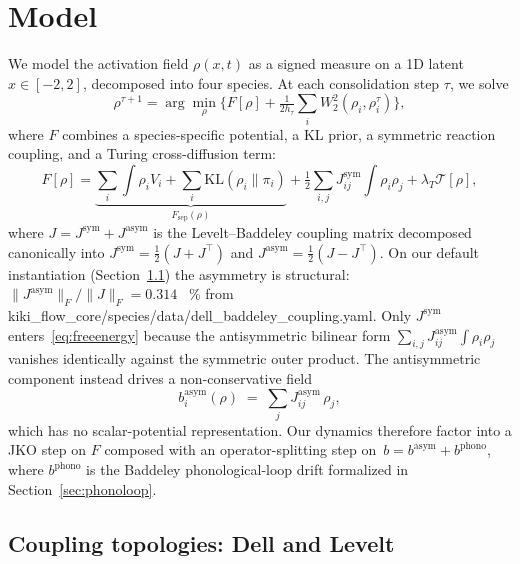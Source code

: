 \documentclass[11pt]{article}
\begin{document}
\section{Model}
\label{sec:model}

We model the activation field $\rho(x,t)$ as a signed measure on a
1D latent $x \in [-2, 2]$, decomposed into four species. At each
consolidation step $\tau$, we solve
\begin{equation}
  \rho^{\tau+1} = \arg\min_{\rho} \Big\{ F[\rho] +
      \tfrac{1}{2h_\tau} \sum_{i} W_2^2(\rho_i, \rho_i^\tau) \Big\},
  \label{eq:jko}
\end{equation}
where $F$ combines a species-specific potential, a KL prior, a
symmetric reaction coupling, and a Turing cross-diffusion term:
\begin{equation}
  F[\rho] = \underbrace{\sum_i \int \rho_i V_i
                      + \sum_i \mathrm{KL}(\rho_i \| \pi_i)}_{\displaystyle F_{\mathrm{sep}}(\rho)}
          + \tfrac{1}{2}\!\!\sum_{i,j} J^{\mathrm{sym}}_{ij} \!\!\int \rho_i \rho_j
          + \lambda_T \mathcal{T}[\rho],
  \label{eq:freeenergy}
\end{equation}
where $J = J^{\mathrm{sym}} + J^{\mathrm{asym}}$ is the Levelt--Baddeley
coupling matrix decomposed canonically into
$J^{\mathrm{sym}} = \tfrac{1}{2}(J + J^{\!\top})$ and
$J^{\mathrm{asym}} = \tfrac{1}{2}(J - J^{\!\top})$.
On our default instantiation (Section~\ref{sec:coupling}) the
asymmetry is structural:
$\|J^{\mathrm{asym}}\|_F / \|J\|_F = 0.314$~%
{\small\% from kiki\_flow\_core/species/data/dell\_baddeley\_coupling.yaml}.
Only $J^{\mathrm{sym}}$ enters~\eqref{eq:freeenergy} because the
antisymmetric bilinear form $\sum_{i,j} J^{\mathrm{asym}}_{ij}
\!\int\!\rho_i\rho_j$ vanishes identically against the symmetric outer
product. The antisymmetric component instead drives a
non-conservative field
\begin{equation}
  b^{\mathrm{asym}}_i(\rho) \;=\; \sum_j J^{\mathrm{asym}}_{ij}\,\rho_j,
  \label{eq:drift-asym}
\end{equation}
which has no scalar-potential representation. Our dynamics therefore
factor into a JKO step on $F$ composed with an operator-splitting step
on~$b = b^{\mathrm{asym}} + b^{\mathrm{phono}}$, where
$b^{\mathrm{phono}}$ is the Baddeley phonological-loop drift formalized
in Section~\ref{sec:phonoloop}.

\subsection{Coupling topologies: Dell and Levelt}
\label{sec:coupling}
\end{document}
